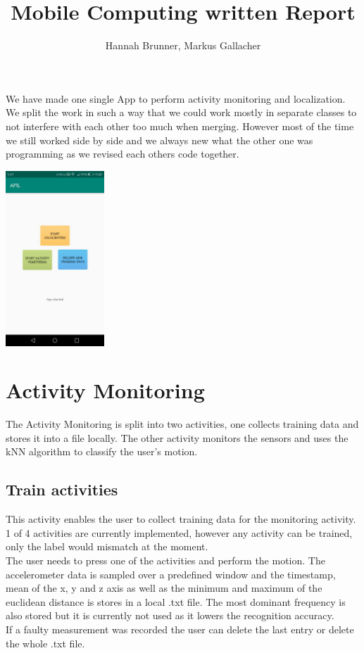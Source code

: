 \documentclass[12pt]{article}
\begin{document}
 
\title{Mobile Computing written Report}
\author{Hannah Brunner, Markus Gallacher}

\maketitle


We have made one single App to perform activity monitoring and localization. We split the work in such a way that we could work mostly in separate classes to not interfere with each other too much when merging. However most of the time we still worked side by side and we always new what the other one was programming as we revised each others code together.

\begin{center}
  \includegraphics[width=140px]{images/main.jpeg}
\end{center}

\pagebreak

\section{Activity Monitoring}
The Activity Monitoring is split into two activities, one collects training data and stores it into a file locally. The other activity monitors the sensors and uses the kNN algorithm to classify the user's motion.

\subsection{Train activities}
This activity enables the user to collect training data for the monitoring activity. 1 of 4 activities are currently implemented, however any activity can be trained, only the label would mismatch at the moment.
\\
The user needs to press one of the activities and perform the motion. The accelerometer data is sampled over a predefined window and the timestamp, mean of the x, y and z axis as well as the minimum and maximum of the euclidean distance is stores in a local .txt file. The most dominant frequency is also stored but it is currently not used as it lowers the recognition accuracy.
\\
If a faulty measurement was recorded the user can delete the last entry or delete the whole .txt file.
\end{document}
